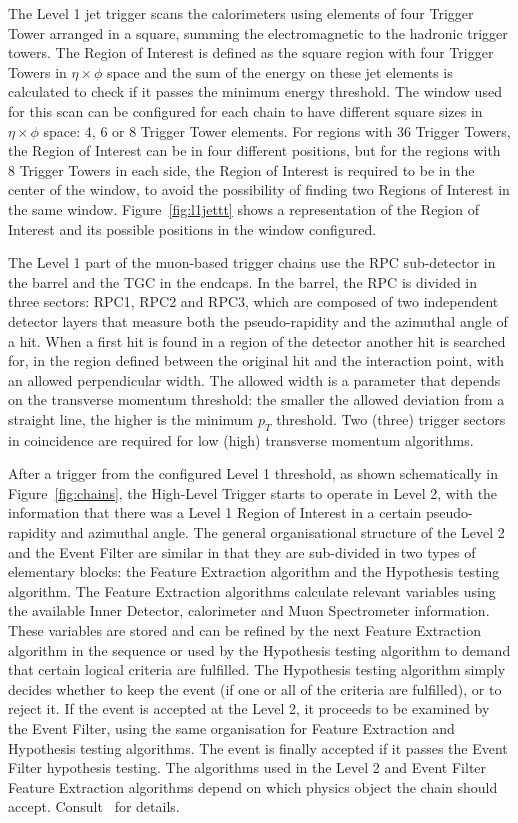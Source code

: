 The Level 1 jet trigger scans the calorimeters using elements of four Trigger Tower arranged in a square, summing the electromagnetic to the hadronic trigger towers.
The Region of Interest is defined as the square region with four Trigger Towers in $\eta \times \phi$ space and the sum of the energy on these jet elements is calculated to check if
it passes the minimum energy threshold. The window used for this scan can be configured for each chain to have different square sizes in $\eta \times \phi$ space: 4, 6 or 8 Trigger Tower elements.
For regions with 36 Trigger Towers, the Region of Interest can be in four different positions, but for the regions with 8 Trigger Towers in each side, the Region of Interest is required to be in
the center of the window, to avoid the possibility of finding two Regions of Interest in the same window.
Figure~\ref{fig:l1jettt} shows a representation of the Region of Interest and its possible positions in the window configured.

The Level 1 part of the muon-based trigger chains use the RPC sub-detector in the barrel and the TGC in the endcaps. In the barrel, the RPC is divided in three sectors:
RPC1, RPC2 and RPC3, which are composed of two independent detector layers that measure both the pseudo-rapidity and the azimuthal angle of a hit. 
When a first hit is found in a region of the detector
another hit is searched for, in the region defined
between the original hit and the interaction point, with an allowed
perpendicular width. The allowed width is a parameter that depends on the transverse momentum
threshold: the smaller the allowed deviation from a straight line, the higher is the minimum $p_T$ threshold. Two (three) trigger sectors in coincidence
are required for low (high) transverse
momentum algorithms.

After a trigger from the configured Level 1 threshold, as shown schematically in Figure~\ref{fig:chains}, the High-Level Trigger starts to operate in Level 2,
with the information that there was a Level 1 Region of Interest in a certain pseudo-rapidity and azimuthal angle. The general organisational
structure of the Level 2 and the Event Filter are similar in that they are sub-divided in two types of elementary blocks: the Feature Extraction
algorithm and the Hypothesis testing algorithm. The Feature Extraction algorithms calculate relevant variables using the available Inner Detector, calorimeter and Muon
Spectrometer information. These variables are stored and can be refined by the next Feature Extraction algorithm in the sequence or used by the Hypothesis
testing algorithm to demand that certain logical criteria are fulfilled. The Hypothesis testing algorithm simply decides whether to keep the event (if one or all
of the criteria are fulfilled), or to reject it. If the event is accepted at the Level 2, it proceeds to be examined by the Event Filter, using the
same organisation for Feature Extraction and Hypothesis testing algorithms. The event is finally accepted if it passes the Event Filter hypothesis testing.
The algorithms used in the Level 2 and Event Filter Feature Extraction algorithms depend on which physics object the chain should accept. Consult~\cite{detpaper}
for details.

